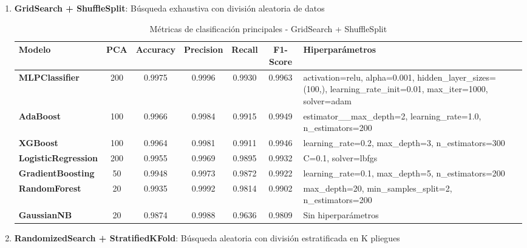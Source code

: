 \documentclass{article}
\begin{document}
\begin{enumerate}
    \item \textbf{GridSearch + ShuffleSplit}: Búsqueda exhaustiva con división aleatoria de datos

\begin{table}[H]
    \centering
    \begin{tabular}{|l|c|c|c|c|c|p{4cm}|}
    \hline
    \rowcolor{tableblue} \textbf{Modelo} & \textbf{PCA} & \textbf{Accuracy} & \textbf{Precision} & \textbf{Recall} & \textbf{F1-Score} & \textbf{Hiperparámetros} \\
    \hline
    \textbf{MLPClassifier} & 200 & 0.9975 & 0.9996 & 0.9930 & 0.9963 & \small{activation=relu, alpha=0.001, hidden\_layer\_sizes=(100,), learning\_rate\_init=0.01, max\_iter=1000, solver=adam} \\
    \hline
    \textbf{AdaBoost} & 100 & 0.9966 & 0.9984 & 0.9915 & 0.9949 & \small{estimator\_\_max\_depth=2, learning\_rate=1.0, n\_estimators=200} \\
    \hline
    \textbf{XGBoost} & 100 & 0.9964 & 0.9981 & 0.9911 & 0.9946 & \small{learning\_rate=0.2, max\_depth=3, n\_estimators=300} \\
    \hline
    \textbf{LogisticRegression} & 200 & 0.9955 & 0.9969 & 0.9895 & 0.9932 & \small{C=0.1, solver=lbfgs} \\
    \hline
    \textbf{GradientBoosting} & 50 & 0.9948 & 0.9973 & 0.9872 & 0.9922 & \small{learning\_rate=0.1, max\_depth=5, n\_estimators=200} \\
    \hline
    \textbf{RandomForest} & 20 & 0.9935 & 0.9992 & 0.9814 & 0.9902 & \small{max\_depth=20, min\_samples\_split=2, n\_estimators=200} \\
    \hline
    \textbf{GaussianNB} & 20 & 0.9874 & 0.9988 & 0.9636 & 0.9809 & \small{Sin hiperparámetros} \\
    \hline
    \end{tabular}
    \caption{Métricas de clasificación principales - GridSearch + ShuffleSplit}
    \label{tab:metricas_gridsearch_shufflesplit}
\end{table}

    \item \textbf{RandomizedSearch + StratifiedKFold}: Búsqueda aleatoria con división estratificada en K pliegues


\end{enumerate}
\end{document}
